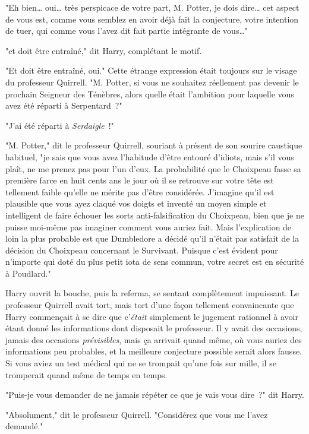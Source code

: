 "Eh bien… oui… très perspicace de votre part, M. Potter, je dois dire… cet aspect de vous est, comme vous semblez en avoir déjà fait la conjecture, votre intention de tuer, qui comme vous l'avez dit fait partie intégrante de vous…"

"et doit être entraîné," dit Harry, complétant le motif.

"Et doit être entraîné, oui." Cette étrange expression était toujours sur le visage du professeur Quirrell. "M. Potter, si vous ne souhaitez réellement pas devenir le prochain Seigneur des Ténèbres, alors quelle était l'ambition pour laquelle vous avez été réparti à Serpentard~?"

"J'ai été réparti à \emph{Serdaigle}~!"

"M. Potter," dit le professeur Quirrell, souriant à présent de son sourire caustique habituel, "je sais que vous avez l'habitude d'être entouré d'idiots, mais s'il vous plaît, ne me prenez pas pour l'un d'eux. La probabilité que le Choixpeau fasse sa première farce en huit cents ans le jour où il se retrouve sur votre tête est tellement faible qu'elle ne mérite pas d'être considérée. J'imagine qu'il est plausible que vous ayez claqué vos doigts et inventé un moyen simple et intelligent de faire échouer les sorts anti-falsification du Choixpeau, bien que je ne puisse moi-même pas imaginer comment vous auriez fait. Mais l'explication de loin la plus probable est que Dumbledore a décidé qu'il n'était pas satisfait de la décision du Choixpeau concernant le Survivant. Puisque c'est évident pour n'importe qui doté du plus petit iota de sens commun, votre secret est en sécurité à Poudlard."

Harry ouvrit la bouche, puis la referma, se sentant complètement impuissant. Le professeur Quirrell avait tort, mais tort d'une façon tellement convaincante que Harry commençait à se dire que c'\emph{était} simplement le jugement rationnel à avoir étant donné les informations dont disposait le professeur. Il y avait des occasions, jamais des occasions \emph{prévisibles}, mais ça arrivait quand même, où vous auriez des informations peu probables, et la meilleure conjecture possible serait alors fausse. Si vous aviez un test médical qui ne se trompait qu'une fois sur mille, il se tromperait quand même de temps en temps.

"Puis-je vous demander de ne jamais répéter ce que je vais vous dire~?" dit Harry.

"Absolument," dit le professeur Quirrell. "Considérez que vous me l'avez demandé."

